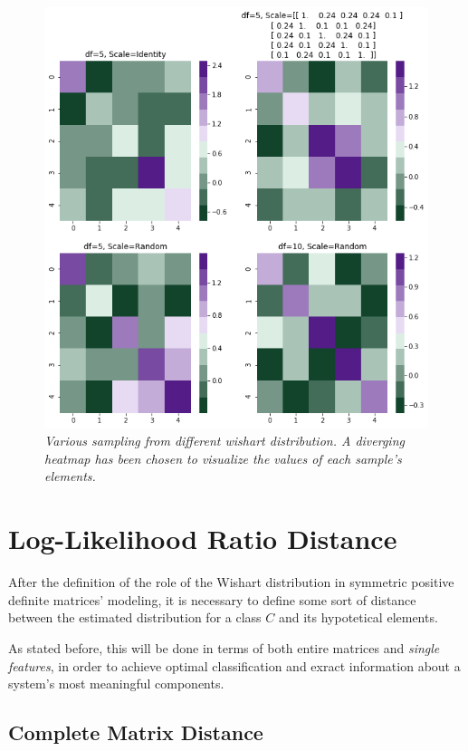 \documentclass[12pt,openright,twoside,a4paper]{book}
\begin{document}
\begin{figure}[!h]
\centering
\includegraphics[scale=0.5]{randmatr}
\caption{\textit{Various sampling from different wishart distribution. A diverging heatmap has been chosen to visualize the values of each sample's elements.}}
\label{randmatr}
\end{figure}

\section{Log-Likelihood Ratio Distance}

After the definition of the role of the Wishart distribution in symmetric positive definite matrices' modeling, it is necessary to define some sort of distance between the estimated distribution for a class $C$ and its hypotetical elements.

As stated before, this will be done in terms of both entire matrices and \textit{single features}, in order to achieve optimal classification and exract information about a system's most meaningful components.

\subsection{Complete Matrix Distance}
\end{document}
